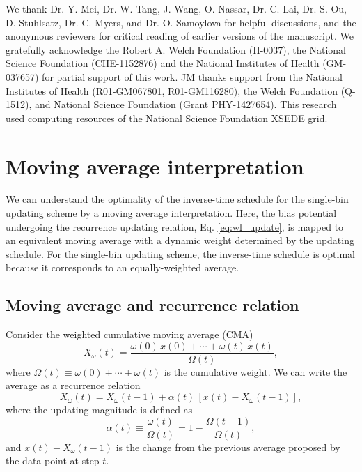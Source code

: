 \documentclass[preprint, superscriptaddress, floatfix]{revtex4-1}
\begin{document}
We thank Dr. Y. Mei, Dr. W. Tang, J. Wang,
O. Nassar, Dr. C. Lai, Dr. S. Ou, D. Stuhlsatz,
Dr. C. Myers, and Dr. O. Samoylova
for helpful discussions,
and the anonymous reviewers for critical reading
of earlier versions of the manuscript.
%
We gratefully acknowledge the Robert A. Welch Foundation (H-0037),
the National Science Foundation (CHE-1152876)
and the National Institutes of Health (GM-037657)
for partial support of this work.
%
JM thanks support from the National Institutes of Health
(R01-GM067801, R01-GM116280),
the Welch Foundation (Q-1512),
and National Science Foundation (Grant PHY-1427654).
%
This research used computing resources of
the National Science Foundation XSEDE grid.
%


\appendix




\section{\label{sec:equilerr}
Moving average interpretation
}



We can understand
the optimality of the inverse-time schedule
for the single-bin updating scheme
by a moving average interpretation.
%
Here, the bias potential undergoing
the recurrence updating relation,
Eq. \eqref{eq:wl_update},
is mapped to an equivalent moving average
with a dynamic weight
determined by the updating schedule.
%
For the single-bin updating scheme,
the inverse-time schedule is optimal
because it corresponds to an equally-weighted average.


\subsection{Moving average and recurrence relation}

Consider the weighted cumulative moving average (CMA)
%
\begin{equation}
  X_\omega(t)
  =
  \frac{
    \omega(0) \, x(0) + \cdots + \omega(t) \, x(t)
  }
  {
    \Omega(t)
  }
  ,
  \label{eq:X_ave}
\end{equation}
%
where
$\Omega(t) \equiv \omega(0) + \cdots + \omega(t)$
is the cumulative weight.
%
We can write the average as a recurrence relation
%
\begin{equation}
  X_\omega(t)
  = X_\omega(t-1)
  +
  \alpha(t)
  \, [ x(t) - X_\omega(t-1) ]
  ,
  \label{eq:X_recur}
\end{equation}
%
where the updating magnitude is defined as
%
\begin{equation}
  \alpha(t) \equiv
  \frac{ \omega(t) } {\Omega(t)}
  =
  1 - \frac{ \Omega(t-1) } {\Omega(t)}
  ,
  \label{eq:alpha_from_Omega}
\end{equation}
%
and $x(t) - X_\omega(t-1)$
is the change from the previous average
proposed by the data point at step $t$.
\end{document}

